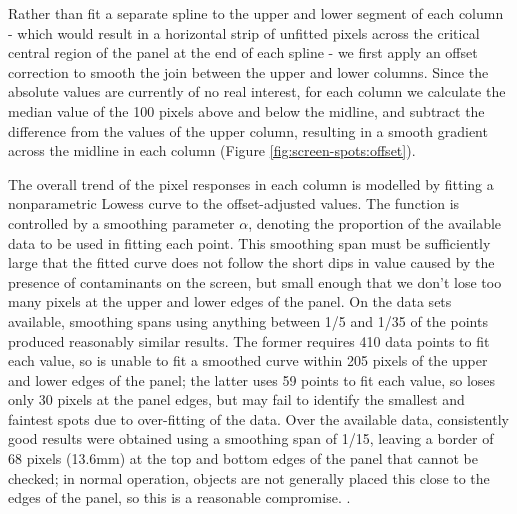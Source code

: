 \documentclass[\main/IO-Pixels.tex]{subfiles}
\begin{document}
Rather than fit a separate spline to the upper and lower segment of each column - which would result in a horizontal strip of unfitted pixels across the critical central region of the panel at the end of each spline - we first apply an offset correction to smooth the join between the upper and lower columns. Since the absolute values are currently of no real interest, for each column we calculate the median value of the 100 pixels above and below the midline, and subtract the difference from the values of the upper column, resulting in a smooth gradient across the midline in each column (Figure \ref{fig:screen-spots:offset}). 

The overall trend of the pixel responses in each column is modelled by fitting a nonparametric Lowess curve to the offset-adjusted values. The function is controlled by a smoothing parameter $\alpha$, denoting the proportion of the available data to be used in fitting each point. This smoothing span must be sufficiently large that the fitted curve does not follow the short dips in value caused by the presence of contaminants on the screen, but small enough that we don't lose too many pixels at the upper and lower edges of the panel. On the data sets available, smoothing spans using anything between 1/5 and 1/35 of the points produced reasonably similar results. The former requires 410 data points to fit each value, so is unable to fit a smoothed curve within 205 pixels of the upper and lower edges of the panel; the latter uses 59 points to fit each value, so loses only 30 pixels at the panel edges, but may fail to identify the smallest and faintest spots due to over-fitting of the data. Over the available data, consistently good results were obtained using a smoothing span of 1/15, leaving a border of 68 pixels (13.6mm) at the top and bottom edges of the panel that cannot be checked; in normal operation, objects are not generally placed this close to the edges of the panel, so this is a reasonable compromise. . 
\end{document}
